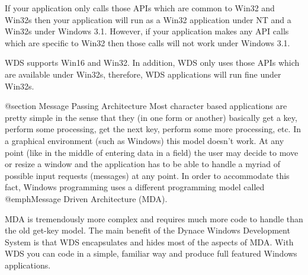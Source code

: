 If your application only calls those APIs which are common to Win32
and Win32s then your application will run as a Win32 application under
NT and a Win32s under Windows 3.1.  However, if your application makes
any API calls which are specific to Win32 then those calls will not
work under Windows 3.1.

WDS supports Win16 and Win32.  In addition, WDS only uses those APIs
which are available under Win32s, therefore, WDS applications will
run fine under Win32s.

@section Message Passing Architecture
Most character based applications are pretty simple in the sense that
they (in one form or another) basically get a key, perform some processing,
get the next key, perform some more processing, etc.  In a graphical
environment (such as Windows) this model doesn't work.  At any point
(like in the middle of entering data in a field) the user may decide
to move or resize a window and the application has to be able to
handle a myriad of possible input requests (messages) at any point.
In order to accommodate this fact, Windows programming uses a different
programming model called @emph{Message Driven Architecture} (MDA).

MDA is tremendously more complex and requires much more code to handle
than the old get-key model.  The main benefit of the Dynace Windows
Development System is that WDS encapsulates and hides most of the
aspects of MDA.  With WDS you can code in a simple, familiar way and
produce full featured Windows applications.

